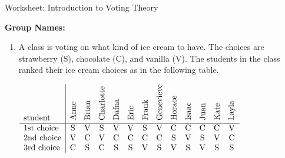 \documentclass[12pt]{article}
\begin{document}
\begin{center}
{\Large  Worksheet:  Introduction to Voting Theory}
\end{center}



\noindent \textbf{Group Names:} \hrulefill \\
          

\begin{enumerate}     

\item A class is voting on what kind of ice cream to have. The choices are strawberry (S), chocolate (C), and vanilla (V). The students in the class ranked their ice cream choices as in the following table.

$
\begin{array}{l|cccccccccccc}
\text{student} & \rotatebox{90}{Anne} & \rotatebox{90}{Brian} &\rotatebox{90}{Charlotte}&\rotatebox{90}{Dafna}&\rotatebox{90}{Eric}&\rotatebox{90}{Frank}&\rotatebox{90}{Genevieve}&\rotatebox{90}{Horace}&\rotatebox{90}{Isaac} & \rotatebox{90}{Juan} & \rotatebox{90}{Kate} & \rotatebox{90}{Layla}\\ \hline
%
%
\text{1st choice}&  \text{S} & \text{V} & \text{S} & \text{V}
   & \text{V} & \text{S} & \text{V} &
   \text{C} & \text{C} & \text{C} & \text{C} & \text{V} \\
   \text{2nd choice} & \text{V} & \text{C} & \text{V} & \text{C}
   & \text{C} & \text{C} & \text{C} &
   \text{S} & \text{V} & \text{S} & \text{V} & \text{C} \\
   \text{3rd choice}& \text{C} & \text{S} & \text{C} & \text{S}
   & \text{S} & \text{V} & \text{S} &
   \text{V} & \text{S} & \text{V} &\text{S} & \text{S} \\\end{array}
$


\end{enumerate}
\end{document}
